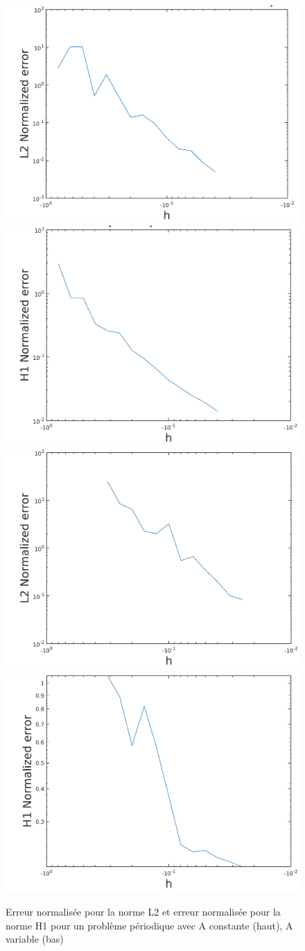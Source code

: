 \documentclass[11pt]{article}
\begin{document}
\begin{figure}
  \centering
  \includegraphics[width=.48\textwidth]{periodique/L2_Acst}
  \hfill
  \includegraphics[width=.48\textwidth]{periodique/H1_Acst} \\
  \includegraphics[width=.48\textwidth]{periodique/L2_Avar}
  \hfill
  \includegraphics[width=.48\textwidth]{periodique/H1_Avar}
  \caption{Erreur normalisée pour la norme L2 et erreur normalisée pour la norme H1 pour un problème périodique avec A constante (haut), A variable (bas)}
  \label{fig:avar}
\end{figure}
\end{document}
